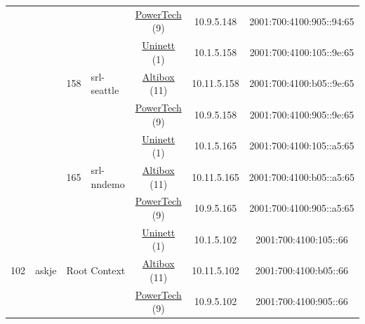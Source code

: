 \begin{small}
\begin{center}
\begin{longtable}{|c|c|c|c|c|c|c|c|}
  &  &  &  & \multicolumn{2}{|c|}{\tiny{\href{http://www.powertech.no}{PowerTech} (9)}} & \tiny{10.9.5.148} & \tiny{2001:700:4100:905::94:65} \\* \cline{3-3}\cline{4-4}\cline{5-5}\cline{6-6}\cline{7-7}\cline{8-8}
  &  & \multirow{3}{*}{\tiny{158}} & \multicolumn{1}{|l|}{\multirow{3}{*}{\tiny{srl-seattle}}} & \multicolumn{2}{|c|}{\tiny{\href{https://www.uninett.no}{Uninett} (1)}} & \tiny{10.1.5.158} & \tiny{2001:700:4100:105::9e:65} \\* \cline{5-5}\cline{6-6}\cline{7-7}\cline{8-8}
  &  &  &  & \multicolumn{2}{|c|}{\tiny{\href{https://www.altibox.no}{Altibox} (11)}} & \tiny{10.11.5.158} & \tiny{2001:700:4100:b05::9e:65} \\* \cline{5-5}\cline{6-6}\cline{7-7}\cline{8-8}
  &  &  &  & \multicolumn{2}{|c|}{\tiny{\href{http://www.powertech.no}{PowerTech} (9)}} & \tiny{10.9.5.158} & \tiny{2001:700:4100:905::9e:65} \\* \cline{3-3}\cline{4-4}\cline{5-5}\cline{6-6}\cline{7-7}\cline{8-8}
  &  & \multirow{3}{*}{\tiny{165}} & \multicolumn{1}{|l|}{\multirow{3}{*}{\tiny{srl-nndemo}}} & \multicolumn{2}{|c|}{\tiny{\href{https://www.uninett.no}{Uninett} (1)}} & \tiny{10.1.5.165} & \tiny{2001:700:4100:105::a5:65} \\* \cline{5-5}\cline{6-6}\cline{7-7}\cline{8-8}
  &  &  &  & \multicolumn{2}{|c|}{\tiny{\href{https://www.altibox.no}{Altibox} (11)}} & \tiny{10.11.5.165} & \tiny{2001:700:4100:b05::a5:65} \\* \cline{5-5}\cline{6-6}\cline{7-7}\cline{8-8}
  &  &  &  & \multicolumn{2}{|c|}{\tiny{\href{http://www.powertech.no}{PowerTech} (9)}} & \tiny{10.9.5.165} & \tiny{2001:700:4100:905::a5:65} \\ \hline
 \multirow{27}{*}{\tiny{102}} & \multicolumn{1}{|l|}{\multirow{27}{*}{\tiny{askje}}} & \multicolumn{2}{|c|}{\multirow{3}{*}{\tiny{Root Context}}} & \multicolumn{2}{|c|}{\tiny{\href{https://www.uninett.no}{Uninett} (1)}} & \tiny{10.1.5.102} & \tiny{2001:700:4100:105::66} \\* \cline{5-5}\cline{6-6}\cline{7-7}\cline{8-8}
  &  & \multicolumn{2}{|c|}{} & \multicolumn{2}{|c|}{\tiny{\href{https://www.altibox.no}{Altibox} (11)}} & \tiny{10.11.5.102} & \tiny{2001:700:4100:b05::66} \\* \cline{5-5}\cline{6-6}\cline{7-7}\cline{8-8}
  &  & \multicolumn{2}{|c|}{} & \multicolumn{2}{|c|}{\tiny{\href{http://www.powertech.no}{PowerTech} (9)}} & \tiny{10.9.5.102} & \tiny{2001:700:4100:905::66} \\* \cline{3-3}\cline{4-4}\cline{5-5}\cline{6-6}\cline{7-7}\cline{8-8}

\end{longtable}
\end{center}
\end{small}
